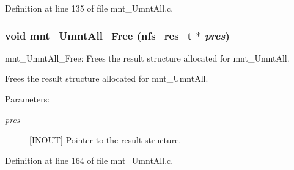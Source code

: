 Definition at line 135 of file mnt\_\-Umnt\-All.c.
\subsubsection{\setlength{\rightskip}{0pt plus 5cm}void mnt\_\-Umnt\-All\_\-Free (nfs\_\-res\_\-t $\ast$ {\em pres})}\label{mnt__UmntAll_8c_a1}


mnt\_\-Umnt\-All\_\-Free: Frees the result structure allocated for mnt\_\-Umnt\-All.

Frees the result structure allocated for mnt\_\-Umnt\-All.

\begin{Desc}
\item[Parameters:]
\begin{description}
\item[{\em pres}][INOUT] Pointer to the result structure. \end{description}
\end{Desc}


Definition at line 164 of file mnt\_\-Umnt\-All.c.